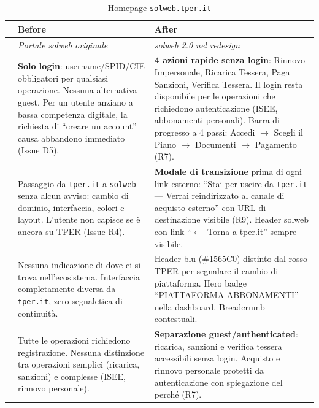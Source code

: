 \begin{table}[H]
\centering
\small
\renewcommand{\arraystretch}{1.4}
\begin{tabular}{|p{0.5cm}|p{7cm}|p{7cm}|}
\hline
& \textbf{Before} & \textbf{After} \\ \hline
\cellcolor{primaryColor!15} &
\textit{Portale solweb originale} &
\textit{solweb 2.0 nel redesign} \\ \hline

\raisebox{0.5cm}{\rotatebox{90}{\textbf{Accesso}}} &
\textbf{Solo login}: username/SPID/CIE obbligatori per qualsiasi operazione. Nessuna alternativa guest. Per un utente anziano a bassa competenza digitale, la richiesta di ``creare un account'' causa abbandono immediato (Issue D5). &
\textbf{4 azioni rapide senza login}: Rinnovo Impersonale, Ricarica Tessera, Paga Sanzioni, Verifica Tessera. Il login resta disponibile per le operazioni che richiedono autenticazione (ISEE, abbonamenti personali). Barra di progresso a 4 passi: Accedi $\rightarrow$ Scegli il Piano $\rightarrow$ Documenti $\rightarrow$ Pagamento (R7). \\ \hline

\raisebox{0.5cm}{\rotatebox{90}{\textbf{Transizione}}} &
Passaggio da \texttt{tper.it} a \texttt{solweb} senza alcun avviso: cambio di dominio, interfaccia, colori e layout. L'utente non capisce se è ancora su TPER (Issue R4). &
\textbf{Modale di transizione} prima di ogni link esterno: ``Stai per uscire da \texttt{tper.it} --- Verrai reindirizzato al canale di acquisto esterno'' con URL di destinazione visibile (R9). Header solweb con link ``$\leftarrow$ Torna a tper.it'' sempre visibile. \\ \hline

\raisebox{0.5cm}{\rotatebox{90}{\textbf{Orientamento}}} &
Nessuna indicazione di dove ci si trova nell'ecosistema. Interfaccia completamente diversa da \texttt{tper.it}, zero segnaletica di continuità. &
Header blu (\#1565C0) distinto dal rosso TPER per segnalare il cambio di piattaforma. Hero badge ``PIATTAFORMA ABBONAMENTI'' nella dashboard. Breadcrumb contestuali. \\ \hline

\raisebox{0.5cm}{\rotatebox{90}{\textbf{Operazioni}}} &
Tutte le operazioni richiedono registrazione. Nessuna distinzione tra operazioni semplici (ricarica, sanzioni) e complesse (ISEE, rinnovo personale). &
\textbf{Separazione guest/authenticated}: ricarica, sanzioni e verifica tessera accessibili senza login. Acquisto e rinnovo personale protetti da autenticazione con spiegazione del perché (R7). \\ \hline
\end{tabular}
\caption{Homepage \texttt{solweb.tper.it}}
\label{tab:comparison-solweb-home}
\end{table}


